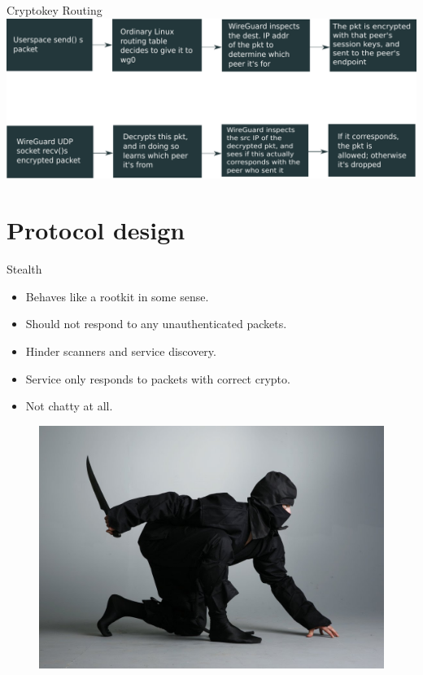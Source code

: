 \documentclass[xcolor=table]{beamer}
\begin{document}
    \begin{frame}[fragile]{Cryptokey Routing}
        \includegraphics[width=\textwidth]{crypto_route.pdf}
    \end{frame}

    \section{Protocol design}

     \begin{frame}{Stealth}
        \begin{minipage}{0.6\textwidth}
            \begin{itemize}
                \item Behaves like a rootkit in some sense.
                \item Should not respond to any unauthenticated packets.
                \item Hinder scanners and service discovery.
                \item Service only responds to packets with correct crypto.
                \item Not chatty at all. 
            \end{itemize} 
        \end{minipage}
        \begin{minipage}{0.37\textwidth}
            \begin{figure}
                \includegraphics[width=\textwidth]{ninja.jpg}
            \end{figure}
        \end{minipage}
    \end{frame}
\end{document}
